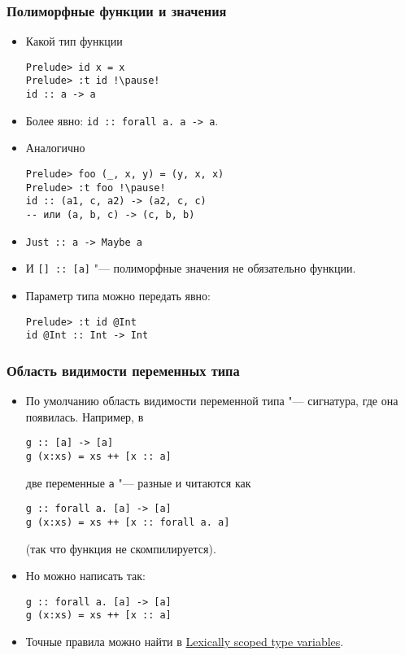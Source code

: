 \documentclass[10pt]{beamer}
\begin{document}
\begin{frame}[fragile]
\frametitle{Полиморфные функции и значения}
\begin{itemize}
    \item Какой тип функции
\begin{lstlisting}[basicstyle=\ttfamily\small]
Prelude> id x = x
Prelude> :t id !\pause!
id :: a -> a
\end{lstlisting}
\item Более явно: \lstinline|id :: forall a. a -> a|.
\item Аналогично
\begin{lstlisting}[basicstyle=\ttfamily\small]
Prelude> foo (_, x, y) = (y, x, x)
Prelude> :t foo !\pause!
id :: (a1, c, a2) -> (a2, c, c) 
-- или (a, b, c) -> (c, b, b)
\end{lstlisting}
\item \lstinline|Just :: a -> Maybe a|
\item И \lstinline|[] :: [a]| "--- полиморфные значения не обязательно функции.
\item Параметр типа можно передать явно:
\begin{lstlisting}[basicstyle=\ttfamily\small]
Prelude> :t id @Int
id @Int :: Int -> Int
\end{lstlisting}
\end{itemize}
\end{frame}

\begin{frame}[fragile]
\frametitle{Область видимости переменных типа}
\begin{itemize}
    \item По умолчанию область видимости переменной типа "--- сигнатура, где она появилась. Например, в
\begin{lstlisting}
g :: [a] -> [a]
g (x:xs) = xs ++ [x :: a]
\end{lstlisting}
    \pause
    две переменные \lstinline|a| "--- разные и читаются как
\begin{lstlisting}
g :: forall a. [a] -> [a]
g (x:xs) = xs ++ [x :: forall a. a]
\end{lstlisting}
    \pause
    (так что функция не скомпилируется). 
    \pause
    \item Но можно написать так:
\begin{lstlisting}
g :: forall a. [a] -> [a]
g (x:xs) = xs ++ [x :: a]
\end{lstlisting}
    \item Точные правила можно найти в \href{http://downloads.haskell.org/~ghc/latest/docs/html/users_guide/glasgow_exts.html#lexically-scoped-type-variables}{Lexically scoped type variables}.
\end{itemize}
\end{frame}
\end{document}
